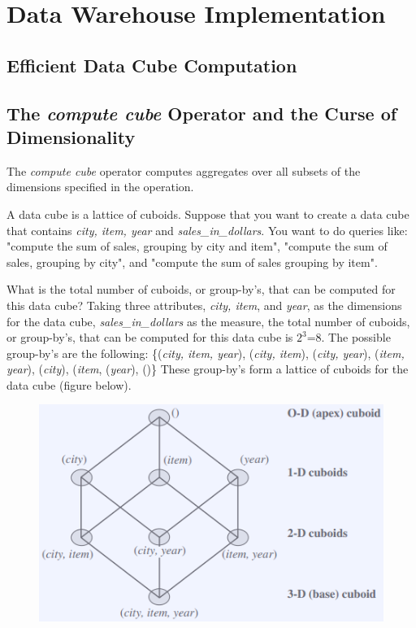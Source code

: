 \clearpage
\section{Data Warehouse Implementation}

	\subsection{Efficient Data Cube Computation}

		\subsection*{The {\it compute cube} Operator and the Curse of Dimensionality}

		The {\it compute cube} operator computes aggregates over all subsets of the 
		dimensions specified in the operation.

		A data cube is a lattice of cuboids. Suppose that you want to create a data cube
		that contains {\it city, item, year} and {\it sales\_in\_dollars}. You want to
		do queries like: "compute the sum of sales, grouping by city and item",
		"compute the sum of sales, grouping by city", and "compute the sum of sales grouping by item".

		What is the total number of cuboids, or group-by's, that can be computed for this
		data cube? Taking three attributes, {\it city, item}, and {\it year}, as the dimensions
		for the data cube, {\it sales\_in\_dollars} as the measure, the total number of 
		cuboids, or group-by's, that can be computed for this data cube is $2^{3}$=8. The
		possible group-by's are the following: \{({\it city, item, year}), ({\it city, item}),
		({\it city, year}), ({\it item, year}), ({\it city}), ({\it item}, ({\it year}), ()\}
		These group-by's form a lattice of cuboids for the data cube (figure below).

		\begin{figure}[H]
			\centering
			\includegraphics[scale=0.5]{pics/groupby.png}
		\end{figure}

